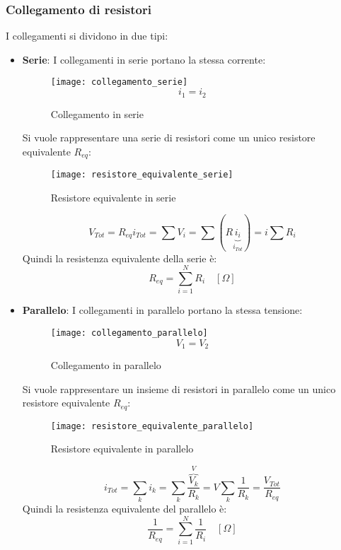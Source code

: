 \documentclass[a4paper]{article}
\begin{document}
\subsubsection{Collegamento di resistori}
I collegamenti si dividono in due tipi:
\begin{itemize}
  \item \textbf{Serie}: I collegamenti in serie portano la stessa corrente:
    \begin{figure}[H]
      \centering
      \texttt{[image: collegamento\_serie]}
      \[
        i_1 = i_2
      \] 
      \caption{Collegamento in serie}
    \end{figure}
    \noindent
    Si vuole rappresentare una serie di resistori come un unico resistore equivalente \( R_{eq} \):
    \begin{figure}[H]
      \centering
      \texttt{[image: resistore\_equivalente\_serie]}
      \caption{Resistore equivalente in serie}
    \end{figure}
    \[
      V_{Tot} = R_{eq} i_{Tot} = \sum V_i = \sum (R\underbrace{i_i}_{i_{Tot}}) 
      = i \sum R_i
    \] 
    Quindi la resistenza equivalente della serie è:
    \[
      R_{eq} = \sum_{i=1}^{N} R_i \quad \left[ \Omega \right]
    \] 
  \item \textbf{Parallelo}: I collegamenti in parallelo portano la stessa tensione:
    \begin{figure}[H]
      \centering
      \texttt{[image: collegamento\_parallelo]}
      \[
        V_1 = V_2
      \]
      \caption{Collegamento in parallelo}
    \end{figure}
    Si vuole rappresentare un insieme di resistori in parallelo come un unico resistore
    equivalente \( R_{eq} \):
    \begin{figure}[H]
      \centering
      \texttt{[image: resistore\_equivalente\_parallelo]}
      \caption{Resistore equivalente in parallelo}
    \end{figure}
    \[
      i_{Tot} = \sum_k i_k = \sum_k \frac{\overbrace{V_k}^{V}}{R_k}
      = V \sum_k \frac{1}{R_k} = \frac{V_{Tot}}{R_{eq}}
    \] 
    Quindi la resistenza equivalente del parallelo è:
    \[
      \frac{1}{R_{eq}} = \sum_{i=1}^{N} \frac{1}{R_i} \quad \left[ \Omega \right]
    \]
\end{itemize}
\end{document}
